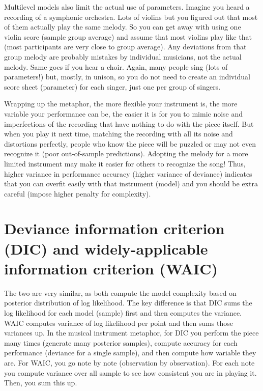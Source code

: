 \documentclass[
]{book}
\begin{document}
Multilevel models also limit the actual use of parameters. Imagine you heard a recording of a symphonic orchestra. Lots of violins but you figured out that most of them actually play the same melody. So you can get away with using one violin score (sample group average) and assume that most violins play like that (most participants are very close to group average). Any deviations from that group melody are probably mistakes by individual musicians, not the actual melody. Same goes if you hear a choir. Again, many people sing (lots of parameters!) but, mostly, in unison, so you do not need to create an individual score sheet (parameter) for each singer, just one per group of singers.

Wrapping up the metaphor, the more flexible your instrument is, the more variable your performance can be, the easier it is for you to mimic noise and imperfections of the recording that have nothing to do with the piece itself. But when you play it next time, matching the recording with all its noise and distortions perfectly, people who know the piece will be puzzled or may not even recognize it (poor out-of-sample predictions). Adopting the melody for a more limited instrument may make it easier for others to recognize the song! Thus, higher variance in performance accuracy (higher variance of deviance) indicates that you can overfit easily with that instrument (model) and you should be extra careful (impose higher penalty for complexity).

\hypertarget{deviance-information-criterion-dic-and-widely-applicable-information-criterion-waic}{%
\section{Deviance information criterion (DIC) and widely-applicable information criterion (WAIC)}\label{deviance-information-criterion-dic-and-widely-applicable-information-criterion-waic}}

The two are very similar, as both compute the model complexity based on posterior distribution of log likelihood. The key difference is that DIC sums the log likelihood for each model (sample) first and then computes the variance. WAIC computes variance of log likelihood per point and then sums those variances up. In the musical instrument metaphor, for DIC you perform the piece many times (generate many posterior samples), compute accuracy for each performance (deviance for a single sample), and then compute how variable they are. For WAIC, you go note by note (observation by observation). For each note you compute variance over all sample to see how consistent you are in playing it. Then, you sum this up.
\end{document}

